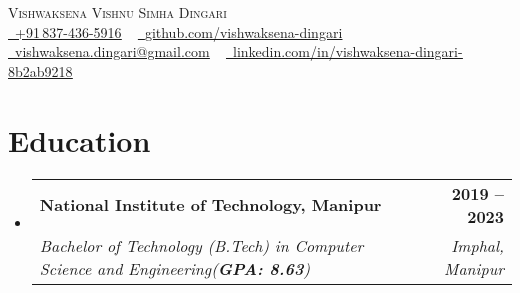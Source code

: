\documentclass[letterpaper,11pt]{article}
\makeatletter
\newcommand{\resumeSubheading}[4]{
  \vspace{-2pt}\item
    \begin{tabular*}{1.0\textwidth}[t]{l@{\extracolsep{\fill}}r}
      \textbf{#1} & \textbf{\small #2} \\
      \textit{\small#3} & \textit{\small #4} \\
    \end{tabular*}\vspace{-7pt}
}
\newcommand{\resumeSubHeadingListStart}{\begin{itemize}[leftmargin=0.0in, label={}]}
\newcommand{\resumeSubHeadingListEnd}{\end{itemize}}
\makeatother
\begin{document}

\begin{center}
  {\Huge \scshape Vishwaksena Vishnu Simha Dingari} \\ \vspace{2pt}
  \href{tel:+918374365916}{\small \raisebox{-0.1\height}\faPhone \ \underline{+91\,837-436-5916}} ~
  \href{https://github.com/vishwaksena-dingari}{\raisebox{-0.2\height}\faGithub\ \underline{github.com/vishwaksena-dingari}}  ~\\ \;\;
  \href{mailto:vishwaksena.dingari@gmail.com}{\raisebox{-0.2\height}\faEnvelope\ \underline{vishwaksena.dingari@gmail.com}} ~
  \href{https://www.linkedin.com/in/vishwaksena-dingari-8b2ab9218}{\raisebox{-0.2\height}\faLinkedinIn\ \underline{linkedin.com/in/vishwaksena-dingari-8b2ab9218}}  ~
  \vspace{-8pt}
\end{center}

\section{Education}
\resumeSubHeadingListStart
\resumeSubheading
{National Institute of Technology, Manipur}{2019 -- 2023}
{Bachelor of Technology (B.Tech) in Computer Science and Engineering(\textbf{GPA: 8.63})}{Imphal, Manipur}
\resumeSubHeadingListEnd




\end{document}
